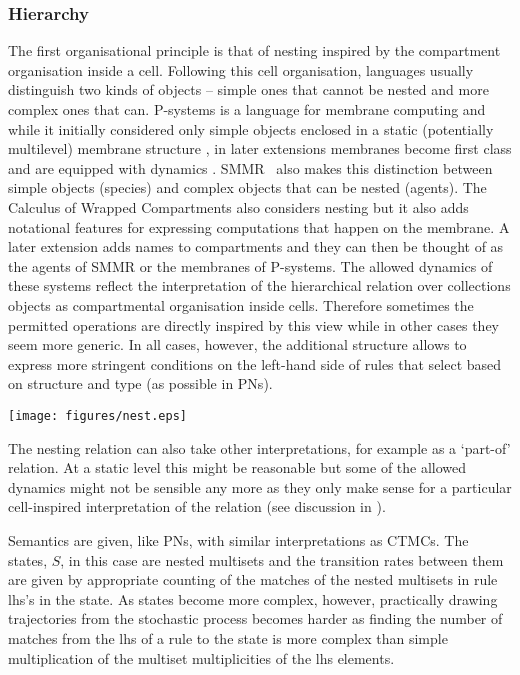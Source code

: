 \subsubsection*{Hierarchy}
The first organisational principle is that of nesting inspired by the
compartment organisation inside a cell. Following this cell organisation,
languages usually distinguish two kinds of objects -- simple ones that cannot be
nested and more complex ones that can. P-systems is a language for membrane
computing and while it initially considered only simple objects enclosed in a
static (potentially multilevel) membrane structure \citep{puaun2000computing},
in later extensions membranes become first class and are equipped with dynamics
\citep{puaun2001p}. SMMR~\citep{oury_multi-level_2013} also makes this
distinction between simple objects (species) and complex objects that can be
nested (agents). The Calculus of Wrapped Compartments \citep{coppo_stochastic}
also considers nesting but it also adds notational features for expressing
computations that happen on the membrane. A later extension
\citep{coppo_hybrid_2010} adds names to compartments and they can then be
thought of as the agents of SMMR or the membranes of P-systems. The allowed
dynamics of these systems reflect the interpretation of the hierarchical
relation over collections objects as compartmental organisation inside
cells. Therefore sometimes the permitted operations are directly inspired by
this view while in other cases they seem more generic. In all cases, however,
the additional structure allows to express more stringent conditions on the
left-hand side of rules that select based on structure and type (as possible in
PNs).
\begin{center}
    \texttt{[image: figures/nest.eps]}
  \end{center}  
The nesting relation can also take other interpretations, for example as a
`part-of' relation. At a static level this might be reasonable but some of the
allowed dynamics might not be sensible any more as they only make sense for a
particular cell-inspired interpretation of the relation (see discussion in
\citet{artale_part-whole_1996}).

Semantics are given, like PNs, with similar interpretations as CTMCs. The
states, $S$, in this case are nested multisets and the transition rates between
them are given by appropriate counting of the matches of the nested multisets in
rule lhs's in the state. As states become more complex, however, practically
drawing trajectories from the stochastic process becomes harder as finding the
number of matches from the lhs of a rule to the state is more complex than
simple multiplication of the multiset multiplicities of the lhs elements.

